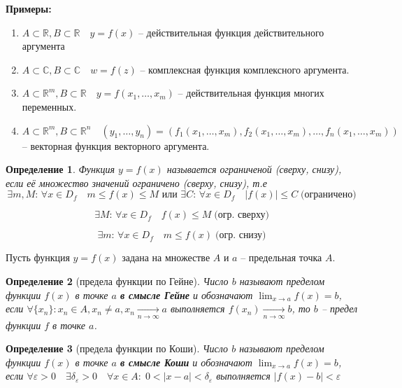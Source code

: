 \documentclass{article}
\newcommand{\dslim}{\displaystyle\lim}
\newcommand{\R}{\mathbb{R}}
\newcommand{\bb}[1]{\mathbb{#1}}
\newcommand{\approach}[1]{\underset{#1}{\longrightarrow}}
\theoremstyle{break}
\newtheorem{definition}{Определение}[subsection]
\begin{document}
\textbf{Примеры:}
\begin{enumerate}
    \item $A \subset \R, B \subset \R \quad y = f(x)$ -- действительная
    функция действительного аргумента

    \item $A \subset \bb{C}, B \subset \bb{C} \quad w = f(z)$ -- комплексная
    функция комплексного аргумента.

    \item $A \subset \R^m, B \subset \R \quad y = f(x_1, \dots, x_m)$ --
    действительная функция многих переменных.

    \item $A \subset \R^m, B \subset \R^n \quad 
    (y_1, \dots, y_n) = (f_1(x_1, \dots, x_m), f_2(x_1, \dots, x_m), \dots, f_n(x_1, \dots, x_m))$ --
    векторная функция векторного аргумента.
\end{enumerate}

\begin{definition}
    Функция $y = f(x)$ называется ограниченой (сверху, снизу), если её множество
    значений ограничено (сверху, снизу), т.е 
    \[
        \exists m, M: \, \forall x \in D_f \quad m \le f(x) \le M
        \text{ или }
        \exists C: \, \forall x \in D_f \quad  | f(x) | \le C
        \; \text{(ограничено)}
    \]

    \[\exists M: \, \forall x \in D_f \quad f(x) \le M \; \text{(огр. сверху)}\]

    \[\exists m: \, \forall x \in D_f \quad m \le f(x) \; \text{(огр. снизу)}\]
\end{definition}

Пусть функция $y = f(x)$ задана на множестве $A$ и $a$ -- предельная точка $A$.

\begin{definition}[предела функции по Гейне]
    Число $b$ называют пределом функции $f(x)$ в точке $a$ \textbf{в смысле Гейне}
    и обозначают $\dslim_{x \to a} f(x) = b$, если
    $\forall \{ x_n \}: x_n \in A, x_n \ne a, x_n \approach{n \to \infty} a$ выполняется
    $f(x_n) \approach{n \to \infty} b$, то $b$ -- предел функции $f$ в точке $a$.
\end{definition}

\begin{definition}[предела функции по Коши]
    Число $b$ называют пределом функции $f(x)$ в точке $a$ \textbf{в смысле Коши}
    и обозначают $\dslim_{x \to a} f(x) = b$, если
    $\forall \varepsilon > 0 \quad \exists \delta_\varepsilon > 0 \quad
    \forall x \in A : \; 0 < | x - a | < \delta_\varepsilon$ выполняется
    $|f(x) - b| < \varepsilon$
\end{definition}
\end{document}

